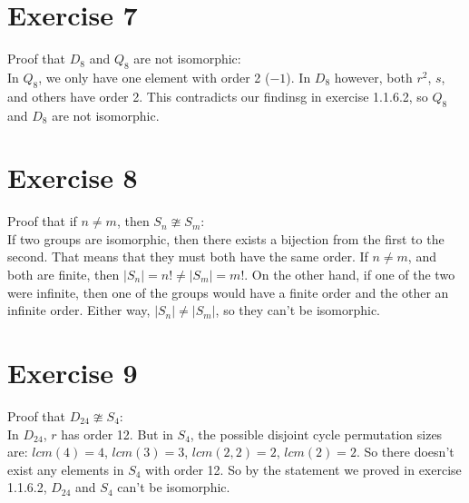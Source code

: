 \documentclass[12pt]{article}
\begin{document}
    \section*{Exercise 7}
    Proof that $D_8$ and $Q_8$ are not isomorphic: \\
    In $Q_8$, we only have one element with order 2 ($-1$).
    In $D_8$ however, both $r^2$, $s$, and others have order 2.
    This contradicts our findinsg in exercise 1.1.6.2,
    so $Q_8$ and $D_8$ are not isomorphic.


    \section*{Exercise 8}
    Proof that if $n \neq m$, then $S_n \ncong S_m$: \\
    If two groups are isomorphic,
    then there exists a bijection from the first to the second.
    That means that they must both have the same order.
    If $n \neq m$, and both are finite,
    then $|S_n| = n! \neq |S_m| = m!$. 
    On the other hand, if one of the two were infinite,
    then one of the groups would have a finite order and the other an
    infinite order.
    Either way, $|S_n| \neq |S_m|$,
    so they can't be isomorphic.


    \section*{Exercise 9}
    Proof that $D_{24} \ncong S_4$: \\
    In $D_{24}$, $r$ has order 12.
    But in $S_4$, the possible disjoint cycle permutation sizes are:
    $lcm(4) = 4$, $lcm(3) = 3$, $lcm(2, 2) = 2$, $lcm(2) = 2$.
    So there doesn't exist any elements in $S_4$ with order 12.
    So by the statement we proved in exercise 1.1.6.2,
    $D_{24}$ and $S_4$ can't be isomorphic.
\end{document}

